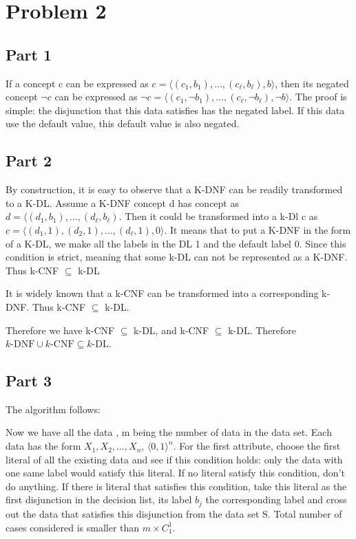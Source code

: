 \section{Problem 2}
\subsection{Part 1}
If a concept c can be expressed as $c =
\langle (c_1,b_1), \ldots, (c_\ell,b_\ell), b\rangle$, then its negated concept $\neg c$ can be expressed as $\neg c =
\langle (c_1,\neg b_1), \ldots, (c_\ell,\neg b_\ell), \neg b\rangle$. The proof is simple: the disjunction that this data satisfies has the negated label. If this data use the default value, this default value is also negated. 

\subsection{Part 2}
By construction, it is easy to observe that a K-DNF can be readily transformed to a K-DL. Assume a K-DNF concept d has concept as $d =
\langle (d_1,b_1), \ldots, (d_\ell,b_\ell)$. Then it could be transformed into a k-Dl c as $c =
\langle (d_1,1), (d_2,1), \ldots, (d_\ell,1), 0\rangle$. It means that to put a K-DNF in the form of a K-DL, we make all the labels in the DL 1 and the default label 0. Since this condition is strict, meaning that some k-DL can not be represented as a K-DNF. Thus k-CNF $\subseteq$ k-DL

It is widely known that a k-CNF can be transformed into a corresponding k-DNF. Thus k-CNF $\subseteq$ k-DL. 

Therefore we have k-CNF $\subseteq$ k-DL, and k-CNF $\subseteq$ k-DL. Therefore $k\textrm{-DNF} \cup k\textrm{-CNF} \subseteq k\textrm{-DL}$.

\subsection{Part 3}
The algorithm follows:

\noindent Now we have all the data , m being the number of data in the data set. Each data has the form $X_1,X_2,\ldots,X_n$, $\langle 0,1 \rangle^n$. For the first attribute, choose the first literal of all the existing data and see if this condition holds: only the data with one same label would satisfy this literal. If no literal satisfy this condition, don't do anything. If there is literal that satisfies this condition, take this literal as the first disjunction in the decision list, its label $b_j$ the corresponding label and cross out the data that satisfies this disjunction from the data set S. Total number of cases considered is smaller than $m\times C_1^1$.  

